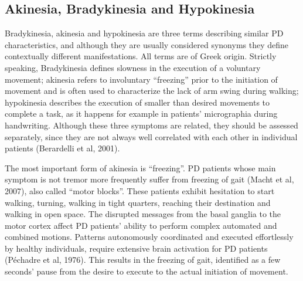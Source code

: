 
\subsection{Akinesia, Bradykinesia and Hypokinesia}
\label{subsec:akinesia}
Bradykinesia, akinesia and hypokinesia are three terms describing similar \gls{PD} characteristics, and although they are usually considered synonyms they define contextually different manifestations. All terms are of Greek origin. Strictly speaking, Bradykinesia defines slowness in the execution of a voluntary movement; akinesia refers to involuntary ``freezing'' prior to the initiation of movement and is often used to characterize the lack of arm swing during walking; hypokinesia describes the execution of smaller than desired movements to complete a task, as it happens for example in patients' micrographia during handwriting. Although these three symptoms are related, they should be assessed separately, since they are not always well correlated with each other in individual patients (Berardelli et al, 2001).

The most important form of akinesia is ``freezing''. \gls{PD} patients whose main symptom is not tremor more frequently suffer from freezing of gait (Macht et al, 2007), also called ``motor blocks''. These patients exhibit hesitation to start walking, turning, walking in tight quarters, reaching their destination and walking in open space. The disrupted messages from the basal ganglia to the motor cortex affect \gls{PD} patients' ability to perform complex automated and combined motions. Patterns autonomously coordinated and executed effortlessly by healthy individuals, require extensive brain activation for \gls{PD} patients (Péchadre et al, 1976). This results in the freezing of gait, identified as a few seconds' pause from the desire to execute to the actual initiation of movement.

